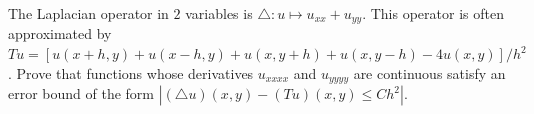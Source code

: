 The Laplacian operator in $2$ variables is $\triangle:u\mapsto
u_{xx}+u_{yy} $. This operator is often approximated by
$Tu=[u(x+h,y)+u(x-h,y)+u(x,y+h)+u(x,y-h)-4u(x,y)]/h^2$. Prove that
functions whose derivatives $u_{xxxx}$ and $u_{yyyy}$ are continuous
satisfy an error bound of the form $|(\triangle u)(x,y)-(Tu)(x,y)\leq
Ch^2|$.

